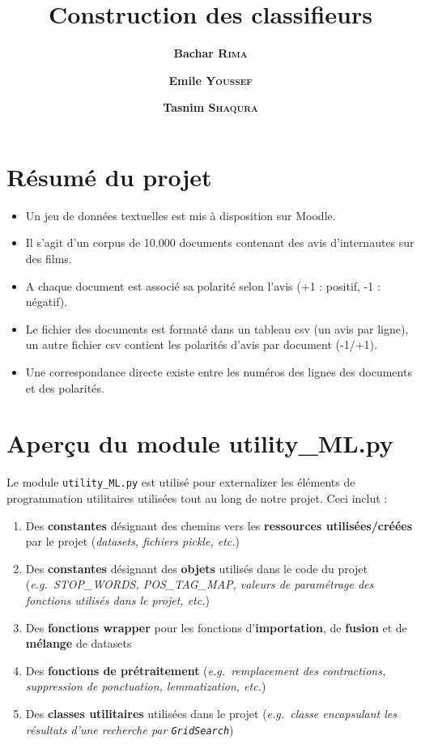 \documentclass[11pt]{article}
\title{Construction des classifieurs}
\author{
  \textbf{Bachar \textsc{Rima}} \and
  \textbf{Emile \textsc{Youssef}} \and
  \textbf{Tasnim \textsc{Shaqura}}
}
\providecommand{\tightlist}{%
  \setlength{\itemsep}{0pt}\setlength{\parskip}{0pt}}
\begin{document}
\maketitle
\tableofcontents
\newpage

\hypertarget{projet---classification-de-documents-dopinions}{%
\section{Résumé du projet}\label{projet---classification-de-documents-dopinions}}
\begin{itemize}
\tightlist
\item
  Un jeu de données textuelles est mis à disposition sur Moodle.\\
\item
  Il s'agit d'un corpus de 10.000 documents contenant des avis
  d'internautes sur des films.\\
\item
  A chaque document est associé sa polarité selon l'avis (+1 : positif,
  -1 : négatif).\\
\item
  Le fichier des documents est formaté dans un tableau csv (un avis par
  ligne), un autre fichier csv contient les polarités d'avis par
  document (-1/+1).\\
\item
  Une correspondance directe existe entre les numéros des lignes des
  documents et des polarités.
\end{itemize}

\hypertarget{aperuxe7u-du-module-utility_ml.py}{%
\section{Aperçu du module
utility\_ML.py}\label{aperuxe7u-du-module-utility_ml.py}}
Le module \texttt{utility\_ML.py} est utilisé pour externalizer les
éléments de programmation utilitaires utilisées tout au long de notre
projet. Ceci inclut :

\begin{enumerate}
  \item Des \textbf{constantes} désignant des chemins
  vers les \textbf{ressources utilisées/créées} par le projet
  (\emph{datasets, fichiers pickle, etc.})
  \item Des \textbf{constantes}
  désignant des \textbf{objets} utilisés dans le code du projet
  (\emph{e.g.~STOP\_WORDS, POS\_TAG\_MAP, valeurs de paramétrage des
  fonctions utilisés dans le projet, etc.})
  \item Des \textbf{fonctions
  wrapper} pour les fonctions d'\textbf{importation}, de \textbf{fusion} et de \textbf{mélange} de
  datasets
  \item Des \textbf{fonctions de prétraitement}
  (\emph{e.g.~remplacement des contractions, suppression de ponctuation,
  lemmatization, etc.})
  \item Des \textbf{classes utilitaires} utilisées
 dans le projet (\emph{e.g.~classe encapsulant les résultats d'une recherche
 par \texttt{GridSearch}})
\end{enumerate}
\end{document}
